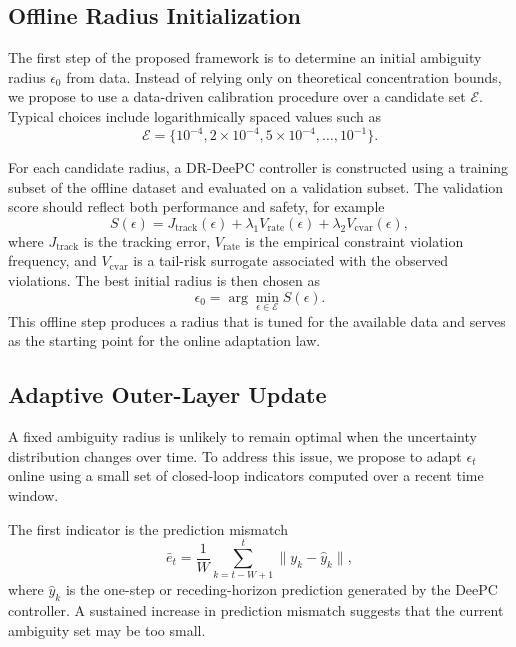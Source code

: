 \documentclass[conference]{IEEEtran}
\begin{document}
\subsection{Offline Radius Initialization}
The first step of the proposed framework is to determine an initial ambiguity radius $\epsilon_0$ from data. Instead of relying only on theoretical concentration bounds, we propose to use a data-driven calibration procedure over a candidate set $\mathcal{E}$. Typical choices include logarithmically spaced values such as
\begin{equation}
\mathcal{E} = \{10^{-4}, 2\times 10^{-4}, 5\times 10^{-4}, \ldots, 10^{-1}\}.
\end{equation}

For each candidate radius, a DR-DeePC controller is constructed using a training subset of the offline dataset and evaluated on a validation subset. The validation score should reflect both performance and safety, for example
\begin{equation}
S(\epsilon) = J_{\mathrm{track}}(\epsilon) + \lambda_1 V_{\mathrm{rate}}(\epsilon) + \lambda_2 V_{\mathrm{cvar}}(\epsilon),
\end{equation}
where $J_{\mathrm{track}}$ is the tracking error, $V_{\mathrm{rate}}$ is the empirical constraint violation frequency, and $V_{\mathrm{cvar}}$ is a tail-risk surrogate associated with the observed violations. The best initial radius is then chosen as
\begin{equation}
\epsilon_0 = \arg\min_{\epsilon \in \mathcal{E}} S(\epsilon).
\end{equation}
This offline step produces a radius that is tuned for the available data and serves as the starting point for the online adaptation law.

\subsection{Adaptive Outer-Layer Update}
A fixed ambiguity radius is unlikely to remain optimal when the uncertainty distribution changes over time. To address this issue, we propose to adapt $\epsilon_t$ online using a small set of closed-loop indicators computed over a recent time window.

The first indicator is the prediction mismatch
\begin{equation}
\bar e_t = \frac{1}{W}\sum_{k=t-W+1}^{t} \lVert y_k - \hat y_k \rVert,
\end{equation}
where $\hat y_k$ is the one-step or receding-horizon prediction generated by the DeePC controller. A sustained increase in prediction mismatch suggests that the current ambiguity set may be too small.
\end{document}
